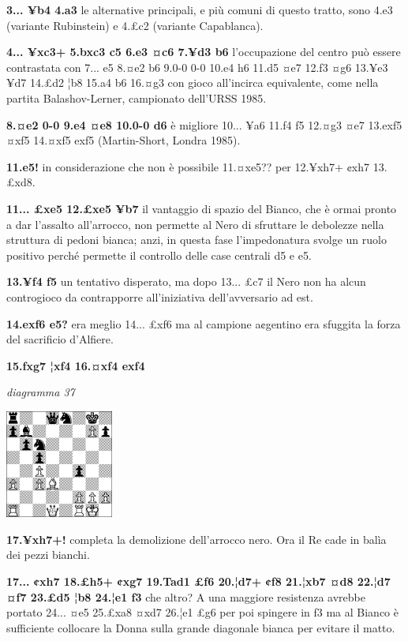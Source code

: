 \documentclass[
]{article}
\begin{document}
\textbf{3... ¥b4 4.a3} le alternative principali, e più comuni di questo
tratto, sono 4.e3 (variante Rubinstein) e 4.£c2 (variante Capablanca).

\textbf{4... ¥xc3+ 5.bxc3 c5 6.e3 ¤c6 7.¥d3 b6} l'occupazione del centro
può essere contrastata con 7... e5 8.¤e2 b6 9.0-0 0-0 10.e4 h6 11.d5 ¤e7
12.f3 ¤g6 13.¥e3 ¥d7 14.£d2 ¦b8 15.a4 b6 16.¤g3 con gioco all'incirca
equivalente, come nella partita Balashov-Lerner, campionato dell'URSS
1985.

\textbf{8.¤e2 0-0 9.e4 ¤e8 10.0-0 d6} è migliore 10... ¥a6 11.f4 f5
12.¤g3 ¤e7 13.exf5 ¤xf5 14.¤xf5 exf5 (Martin-Short, Londra 1985).

\textbf{11.e5!} in considerazione che non è possibile 11.¤xe5?? per
12.¥xh7+ ¢xh7 13.£xd8.

\textbf{11... £xe5 12.£xe5 ¥b7} il vantaggio di spazio del Bianco, che è
ormai pronto a dar l'assalto all'arrocco, non permette al Nero di
sfruttare le debolezze nella struttura di pedoni bianca; anzi, in questa
fase l'impedonatura svolge un ruolo positivo perché permette il
controllo delle case centrali d5 e e5.

\textbf{13.¥f4 f5} un tentativo disperato, ma dopo 13... £c7 il Nero non
ha alcun controgioco da contrapporre all'iniziativa dell'avversario ad
est.

\textbf{14.exf6 e5?} era meglio 14... £xf6 ma al campione a¢gentino era
sfuggita la forza del sacrificio d'Alfiere.

\textbf{15.fxg7 ¦xf4 16.¤xf4 exf4}

\emph{diagramma 37}

\includegraphics[width=1.4in,height=1.4in]{vertopal_109f12be458a423d8f3cc838880eaea2/media/image37.png}

\textbf{17.¥xh7+!} completa la demolizione dell'arrocco nero. Ora il Re
cade in balìa dei pezzi bianchi.

\textbf{17... ¢xh7 18.£h5+ ¢xg7 19.Tad1 £f6 20.¦d7+ ¢f8 21.¦xb7 ¤d8
22.¦d7 ¤f7 23.£d5 ¦b8 24.¦e1 f3} che altro? A una maggiore resistenza
avrebbe portato 24... ¤e5 25.£xa8 ¤xd7 26.¦e1 £g6 per poi spingere in f3
ma al Bianco è sufficiente collocare la Donna sulla grande diagonale
bianca per evitare il matto.
\end{document}
